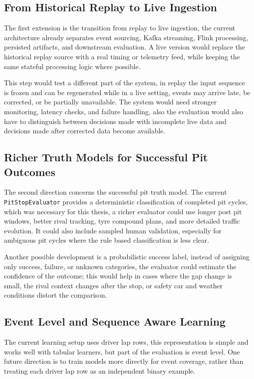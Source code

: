 \subsection{From Historical Replay to Live Ingestion}

The first extension is the transition from replay to live ingestion, the current architecture already separates event sourcing, Kafka streaming, Flink processing,
persisted artifacts, and downstream evaluation. A live version would replace the historical replay source with a real timing or telemetry feed, while keeping the same
stateful processing logic where possible.

This step would test a different part of the system, in replay the input sequence is frozen and can be regenerated while in a live setting, events may arrive late, be
corrected, or be partially unavailable. The system would need stronger monitoring, latency checks, and failure handling, also the evaluation would also have to distinguish
between decisions made with incomplete live data and decisions made after corrected data become available.

\subsection{Richer Truth Models for Successful Pit Outcomes}

The second direction concerns the successful pit truth model. The current \texttt{PitStopEvaluator} provides a deterministic classification of completed pit cycles,
which was necessary for this thesis, a richer evaluator could use longer post pit windows, better rival tracking, tyre compound plans, and more detailed traffic evolution.
It could also include sampled human validation, especially for ambiguous pit cycles where the rule based classification is less clear.

Another possible development is a probabilistic success label, instead of assigning only success, failure, or unknown categories, the evaluator could estimate the
confidence of the outcome; this would help in cases where the gap change is small, the rival context changes after the stop, or safety car and weather conditions
distort the comparison.

\subsection{Event Level and Sequence Aware Learning}

The current learning setup uses driver lap rows, this representation is simple and works well with tabular learners, but part of the evaluation is event level. One future
direction is to train models more directly for event coverage, rather than treating each driver lap row as an independent binary example.

